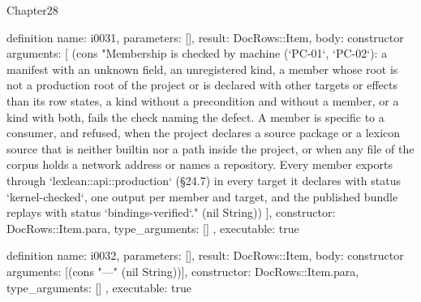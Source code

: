 \begin{lexlean}{Chapter28}
\begin{semanticmodule}
definition{
  name: i0031,
  parameters: [],
  result: DocRows::Item,
  body: constructor{
    arguments: [
      (cons "Membership is checked by machine (`PC-01`, `PC-02`): a manifest with an unknown field, an unregistered kind, a member whose root is not a production root of the project or is declared with other targets or effects than its row states, a kind without a precondition and without a member, or a kind with both, fails the check naming the defect. A member is specific to a consumer, and refused, when the project declares a source package or a lexicon source that is neither builtin nor a path inside the project, or when any file of the corpus holds a network address or names a repository. Every member exports through `lexlean::api::production` (§24.7) in every target it declares with status `kernel-checked`, one output per member and target, and the published bundle replays with status `bindings-verified`." (nil String))
    ],
    constructor: DocRows::Item.para,
    type_arguments: []
  },
  executable: true
}

definition{
  name: i0032,
  parameters: [],
  result: DocRows::Item,
  body: constructor{
    arguments: [(cons "---" (nil String))],
    constructor: DocRows::Item.para,
    type_arguments: []
  },
  executable: true
}
\end{semanticmodule}
\end{lexlean}
